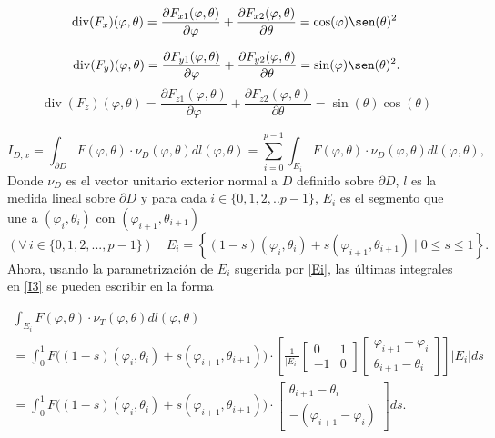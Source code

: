 \documentclass[20pt]{report}
\providecommand{\abs}[1]{\lvert#1\rvert}
\begin{document}
\begin{itemize}
\begin{equation*}
\operatorname{div}(F_x)(\varphi,\theta)
= \frac{\partial F_{x1}(\varphi, \theta)}{\partial \varphi} + \frac{\partial F_{x2}(\varphi, \theta)}{\partial \theta}
= \cos(\varphi) \sen(\theta)^2.
\end{equation*}

\begin{equation*}
\operatorname{div}(F_y)(\varphi,\theta)
= \frac{\partial F_{y1}(\varphi, \theta)}{\partial \varphi} + \frac{\partial F_{y2}(\varphi, \theta)}{\partial \theta}
= \sin(\varphi) \sen(\theta)^2.
\end{equation*}
\begin{equation*}
\operatorname{div}(F_z)(\varphi,\theta)
= \frac{\partial F_{z1}(\varphi, \theta)}{\partial \varphi} + \frac{\partial F_{z2}(\varphi, \theta)}{\partial \theta}
= \sin(\theta)\cos(\theta)
\end{equation*}


\begin{equation}\label{I3}
I_{D,x} = \int_{\partial D} F(\varphi, \theta) \cdot \nu_D(\varphi,\theta) dl(\varphi, \theta)
= \sum_{i=0}^{p-1} \int_{E_i} F(\varphi, \theta) \cdot \nu_D(\varphi,\theta) dl(\varphi, \theta),
\end{equation}
%
Donde $\nu_D$ es el vector unitario exterior normal a $D$ definido sobre $\partial D$, $l$ es la medida lineal sobre $\partial D$ y para cada $i \in \{0, 1, 2,..p-1\}$, $E_i$ es el segmento que une a $(\varphi_i, \theta_i)$ con $(\varphi_{i+1}, \theta_{i+1})$
\begin{equation}\label{Ei}
(\forall\,i\in\{0,1,2,...,p-1\}) \quad E_i = \left\{ (1-s) (\varphi_i, \theta_i) + s (\varphi_{i+1}, \theta_{i+1}) \mid 0 \leq s \leq 1 \right\}.
\end{equation}
%
Ahora, usando la parametrizaci\'on de $E_i$ sugerida por \eqref{Ei}, las \'ultimas integrales en \eqref{I3} se pueden escribir en la forma

\begin{multline}\label{lineIntegrals}
\int_{E_i} F(\varphi, \theta) \cdot \nu_T(\varphi,\theta) d l(\varphi, \theta)\\
= \int_0^1 F\big( (1-s) (\varphi_i, \theta_i) + s (\varphi_{i+1}, \theta_{i+1}) \big) \cdot \left[ \frac{1}{\abs{E_i}} \begin{bmatrix} 0 & 1\\-1 & 0\end{bmatrix} \begin{bmatrix} \varphi_{i+1}-\varphi_i \\ \theta_{i+1} - \theta_i \end{bmatrix} \right] \abs{E_i} d s\\
= \int_0^1 F\big( (1-s) (\varphi_i, \theta_i) + s (\varphi_{i+1}, \theta_{i+1}) \big) \cdot \begin{bmatrix} \theta_{i+1}-\theta_i\\ -(\varphi_{i+1} - \varphi_i) \end{bmatrix} d s.
\end{multline}
 

\end{itemize}
\end{document}
